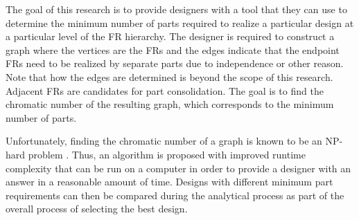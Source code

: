 The goal of this research is to provide designers with a tool that they can use to determine the minimum number of
parts required to realize a particular design at a particular level of the FR hierarchy.  The designer is required
to construct a graph where the vertices are the FRs and the edges indicate that the endpoint FRs need to be
realized by separate parts due to independence or other reason.  Note that how the edges are determined is beyond
the scope of this research.  Adjacent FRs are candidates for part consolidation.  The goal is to find the chromatic
number of the resulting graph, which corresponds to the minimum number of parts.

Unfortunately, finding the chromatic number of a graph is known to be an NP-hard problem \cite{mcdiarmid}.  Thus,
an algorithm is proposed with improved runtime complexity that can be run on a computer in order to provide a
designer with an answer in a reasonable amount of time.  Designs with different minimum part requirements can then
be compared during the analytical process as part of the overall process of selecting the best design.

